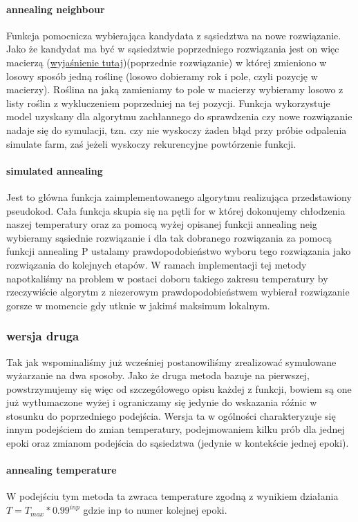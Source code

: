 \documentclass{article}
\begin{document}
\paragraph{annealing neighbour}
Funkcja pomocnicza wybierająca kandydata z sąsiedztwa na nowe rozwiązanie. Jako że kandydat ma być w sąsiedztwie poprzedniego rozwiązania jest on więc macierzą (\hyperref[postac_rozw]{wyjaśnienie tutaj})(poprzednie rozwiązanie) w której zmieniono w losowy sposób jedną roślinę (losowo dobieramy rok i pole, czyli pozycję w macierzy). Roślina na jaką zamieniamy to pole w macierzy wybieramy losowo z listy roślin z wykluczeniem poprzedniej na tej pozycji.
Funkcja wykorzystuje model uzyskany dla algorytmu zachłannego do sprawdzenia czy nowe rozwiązanie nadaje się do symulacji, tzn. czy nie wyskoczy żaden błąd przy próbie odpalenia simulate farm, zaś jeżeli wyskoczy rekurencyjne powtórzenie funkcji.

\paragraph{simulated annealing}
Jest to główna funkcja zaimplementowanego algorytmu realizująca przedstawiony pseudokod. Cała funkcja skupia się na pętli for w której dokonujemy chłodzenia naszej temperatury oraz za pomocą wyżej opisanej funkcji annealing neig  wybieramy sąsiednie rozwiązanie i dla tak dobranego rozwiązania za pomocą funkcji annealing P ustalamy prawdopodobieństwo wyboru tego rozwiązania jako rozwiązania do kolejnych etapów. W ramach implementacji tej metody napotkaliśmy na problem w postaci doboru takiego zakresu temperatury by rzeczywiście algorytm z niezerowym prawdopodobieństwem wybierał rozwiązanie gorsze w momencie gdy utknie w jakimś maksimum lokalnym.


\subsubsection{wersja druga}
Tak jak wspominaliśmy już wcześniej postanowiliśmy zrealizować symulowane wyżarzanie na dwa sposoby. Jako że druga metoda bazuje na pierwszej, powstrzymujemy się więc od szczegółowego opisu każdej z funkcji, bowiem są one już wytłumaczone wyżej i ograniczamy się jedynie do wskazania róźnic w stosunku do poprzedniego podejścia. Wersja ta w ogólności charakteryzuje się innym podejściem do zmian temperatury, podejmowaniem kilku prób dla jednej epoki oraz
zmianom podejścia do sąsiedztwa (jedynie w kontekście jednej epoki).

\paragraph{annealing temperature}
 W podejściu tym metoda ta zwraca temperature zgodną z wynikiem działania $T = T_{max} * 0.99^{inp}$ gdzie inp to numer kolejnej epoki.
\end{document}
